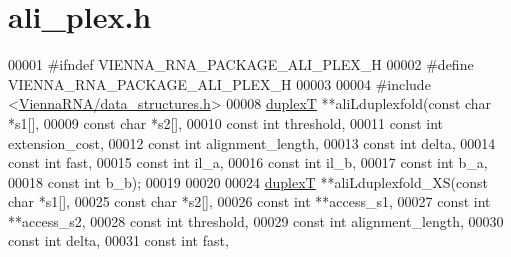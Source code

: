 \hypertarget{ali__plex_8h_source}{}\section{ali\+\_\+plex.\+h}
\label{ali__plex_8h_source}

\begin{DoxyCode}
00001 \textcolor{preprocessor}{#ifndef VIENNA\_RNA\_PACKAGE\_ALI\_PLEX\_H}
00002 \textcolor{preprocessor}{#define VIENNA\_RNA\_PACKAGE\_ALI\_PLEX\_H}
00003 
00004 \textcolor{preprocessor}{#include <\hyperlink{data__structures_8h}{ViennaRNA/data\_structures.h}>}
00008 \hyperlink{group__data__structures_structduplexT}{duplexT} **aliLduplexfold(\textcolor{keyword}{const} \textcolor{keywordtype}{char} *s1[],
00009                          \textcolor{keyword}{const} \textcolor{keywordtype}{char} *s2[],
00010                          \textcolor{keyword}{const} \textcolor{keywordtype}{int}  threshold,
00011                          \textcolor{keyword}{const} \textcolor{keywordtype}{int}  extension\_cost,
00012                          \textcolor{keyword}{const} \textcolor{keywordtype}{int}  alignment\_length,
00013                          \textcolor{keyword}{const} \textcolor{keywordtype}{int}  delta,
00014                          \textcolor{keyword}{const} \textcolor{keywordtype}{int}  fast,
00015                          \textcolor{keyword}{const} \textcolor{keywordtype}{int}  il\_a,
00016                          \textcolor{keyword}{const} \textcolor{keywordtype}{int}  il\_b,
00017                          \textcolor{keyword}{const} \textcolor{keywordtype}{int}  b\_a,
00018                          \textcolor{keyword}{const} \textcolor{keywordtype}{int}  b\_b);
00019 
00020 
00024 \hyperlink{group__data__structures_structduplexT}{duplexT} **aliLduplexfold\_XS(\textcolor{keyword}{const} \textcolor{keywordtype}{char}  *s1[],
00025                             \textcolor{keyword}{const} \textcolor{keywordtype}{char}  *s2[],
00026                             \textcolor{keyword}{const} \textcolor{keywordtype}{int}   **access\_s1,
00027                             \textcolor{keyword}{const} \textcolor{keywordtype}{int}   **access\_s2,
00028                             \textcolor{keyword}{const} \textcolor{keywordtype}{int}   threshold,
00029                             \textcolor{keyword}{const} \textcolor{keywordtype}{int}   alignment\_length,
00030                             \textcolor{keyword}{const} \textcolor{keywordtype}{int}   delta,
00031                             \textcolor{keyword}{const} \textcolor{keywordtype}{int}   fast,

\end{DoxyCode}
